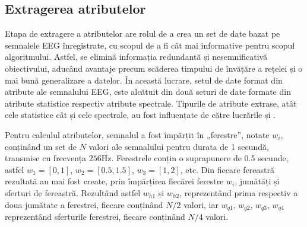 \subsection{Extragerea atributelor}
Etapa de extragere a atributelor are rolul de a crea un set de date bazat pe semnalele EEG înregistrate, cu scopul de a fi cât mai informative pentru scopul algoritmului. Astfel, se elimină informația redundantă și nesemnificativă obiectivului, aducând avantaje precum scăderea timpului de învățăre a rețelei și o mai bună generalizare a datelor. În această lucrare, setul de date format din atribute ale semnalului EEG, este alcătuit din două seturi de date formate din atribute statistice respectiv atribute spectrale. Tipurile de atribute extrase, atât cele statistice cât și cele spectrale, au fost influențate de către lucrările \cite{eeg-cnn:2020} și \cite{eeg:2018}.

Pentru calculul atributelor, semnalul a fost împărțit în „ferestre”, notate $w_i$, conținând un set de $N$ valori ale semnalului pentru durata de 1 secundă, transmise cu frecvența $256\si{\hertz}$. Ferestrele conțin o suprapunere de 0.5 secunde, astfel $w_1=[0,1]$, $w_2=[0.5,1.5]$, $w_3=[1,2]$, etc. Din fiecare fereastră rezultată au mai fost create, prin împărțirea fiecărei ferestre $w_i$, jumătăți și sferturi de fereastră. Rezultând astfel $w_{h1}$ și $w_{h2}$, reprezentând prima respectiv a doua jumătate a ferestrei, fiecare conținând $N/2$ valori, iar $w_{q1}$, $w_{q2}$, $w_{q3}$, $w_{q4}$ reprezentând sferturile ferestrei, fiecare conținând $N/4$ valori.

